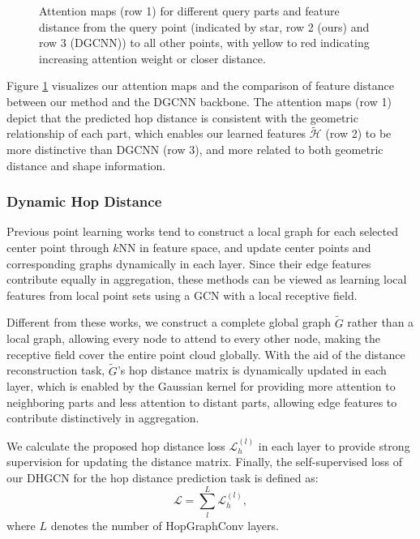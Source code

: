 \documentclass[letterpaper]{article}
\begin{document}
\begin{figure}[htbp]
\begin{center}
\begin{minipage}[b]{0.04\linewidth}
\begin{center}
\end{center}
\end{minipage}
\end{center}
\caption{Attention maps (row 1) for different query parts and feature distance from the query point (indicated by star, row 2 (ours) and row 3 (DGCNN)) to all other points, with yellow to red indicating increasing attention weight or closer distance.}
\label{fig:feature_vis}
\end{figure}

Figure \ref{fig:feature_vis} visualizes our attention maps and the comparison of feature distance between our method and the DGCNN backbone.
The attention maps (row 1) depict that the predicted hop distance is consistent with the geometric relationship of each part, which enables our learned features \(\tilde{\mathcal{H}}\) (row 2) to be more distinctive than DGCNN (row 3), and more related to both geometric distance and shape information.


\subsubsection{Dynamic Hop Distance}
Previous point learning works \cite{dgcnn, pointnet++, guo2021pct} tend to construct a local graph for each selected center point through \(k\)NN in feature space, and update center points and corresponding graphs dynamically in each layer.
Since their edge features contribute equally in aggregation, these methods can be viewed as learning local features from local point sets using a GCN with a local receptive field.


Different from these works, we construct a complete global graph \(\tilde{G}\) rather than a local graph, allowing every node to attend to every other node, making the receptive field cover the entire point cloud globally.
With the aid of the distance reconstruction task,
\(\tilde{G}\)'s hop distance matrix is dynamically updated in each layer, which is enabled by the Gaussian kernel for providing more attention to neighboring parts and less attention to distant parts, allowing edge features to contribute distinctively in aggregation.


We calculate the proposed hop distance loss \(\mathcal{L}_h^{(l)}\) in each layer to provide strong supervision for updating the distance matrix. Finally,
the self-supervised loss of our DHGCN for the hop distance prediction task is defined as:
\begin{equation}
\mathcal{L} = \sum_{l}^{L}\mathcal{L}_h^{(l)},
\end{equation}
where \(L\) denotes the number of HopGraphConv layers.
\end{document}
